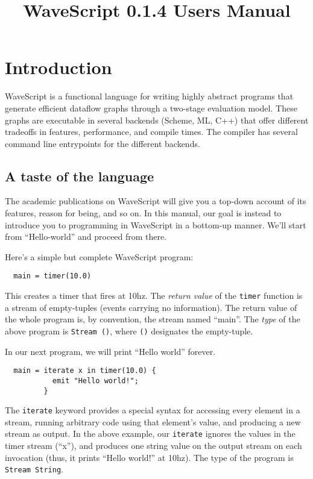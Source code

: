 \documentclass[twocolumn]{report}
\title{WaveScript 0.1.4 Users Manual}
\newcommand{\cd}{\tt}
\newcommand{\ws}{WaveScript}
\begin{document}
\maketitle


\tableofcontents
\clearpage

\chapter{Introduction}

WaveScript is a functional language for writing highly abstract
programs that generate efficient dataflow graphs through a two-stage
evaluation model.  These graphs are
executable in several backends (Scheme, ML, C++) that offer different
tradeoffs in features, performance, and compile times.  The compiler
has several command line entrypoints for the different backends.


\section{A taste of the language}\label{s:taste}

The academic publications on WaveScript will give you a top-down
account of its features, reason for being, and so on.  In this manual,
our goal is instead to introduce you to programming in WaveScript in a
bottom-up manner.  We'll start from ``Hello-world'' and proceed from
there.

Here's a simple but complete {\ws} program:
\begin{verbatim}
  main = timer(10.0)
\end{verbatim}
This creates a timer that fires at 10hz.  The {\em return value} of
the {\cd timer} function is a stream of empty-tuples (events carrying
no information).  The return value of the whole program is, by
convention, the stream named ``main''.  The {\em type} of the above
program is {\cd Stream ()}, where {\cd ()} designates the empty-tuple.

In our next program, we will print ``Hello world'' forever.
\begin{verbatim}
  main = iterate x in timer(10.0) {
           emit "Hello world!";
         }
\end{verbatim}
The {\cd iterate} keyword provides a special syntax for accessing
every element in a stream, running arbitrary code using that element's
value, and producing a new stream as output.  In the above example,
our {\cd iterate} ignores the values in the timer stream (``x''), and
produces one string value on the output stream on each invocation
(thus, it prints ``Hello world!'' at 10hz).  The type of the program
is {\tt Stream String}. 
\end{document}
